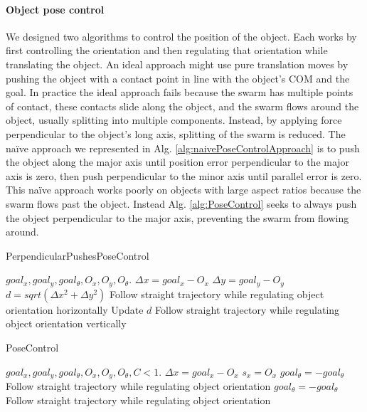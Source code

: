 \paragraph{Object pose control}
We designed two algorithms to control the position of the object.  
Each works by first controlling the orientation and then regulating that orientation while translating the object. 
An ideal approach might use pure translation moves by  pushing  the object with a contact point in line with the object's COM and the goal.
In practice the ideal approach fails because the swarm has multiple points of contact, these contacts slide along the object, and the swarm flows around the object, usually splitting into multiple components.
Instead, by applying force perpendicular to the object's long axis, splitting of the swarm is reduced. 
The na\"{i}ve approach we represented in Alg. \ref{alg:naivePoseControlApproach} is to push the object along the major axis until position error perpendicular to the major axis is zero, then push perpendicular to the minor axis until parallel error is zero. 
This na\"{i}ve approach works poorly on objects with large aspect ratios because the swarm flows past the object. 
Instead Alg. \ref{alg:PoseControl} seeks to always push the object perpendicular to the major axis, preventing the swarm from flowing around. 


\begin{algorithm}
\caption{PerpendicularPushesPoseControl}\label{alg:naivePoseControlApproach}
\begin{algorithmic}[1]
\Require $goal_x, goal_y, goal_{\theta},O_x, O_y, O_{\theta}$.
\State $\Delta x = goal_x - O_x$
\State $\Delta y = goal_y - O_y$
\State $d = sqrt(\Delta x^2 + \Delta y^2) $ 
\State Follow straight trajectory while regulating object orientation horizontally
\State Update $d$
\EndWhile
\State Follow straight trajectory while regulating object orientation vertically
\end{algorithmic}
\end{algorithm}



\begin{algorithm}
\caption{PoseControl}\label{alg:PoseControl}
\begin{algorithmic}[1]
\Require $goal_x, goal_y, goal_{\theta},O_x, O_y, O_{\theta}, C<1$.
\State $\Delta x = goal_x - O_x$
\State $s_x = O_x$ 
\State $goal_{\theta} = -goal_{\theta}$ 
\State Follow straight trajectory while regulating object orientation
\EndWhile
\State $goal_{\theta} = -goal_{\theta}$
\State Follow straight trajectory while regulating object orientation
\end{algorithmic}
\end{algorithm}




